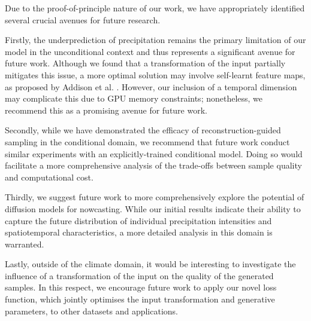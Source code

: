 \documentclass[ oneside,%
                    author={George Herbert},
                    degree={MSci},
                     title={Diffusion Models for Time-Evolving Precipitation Fields},
                  subtitle={}]{dissertation}
\begin{document}
Due to the proof-of-principle nature of our work, we have appropriately identified several crucial avenues for future research.

Firstly, the underprediction of precipitation remains the primary limitation of our model in the unconditional context and thus represents a significant avenue for future work. Although we found that a transformation of the input partially mitigates this issue, a more optimal solution may involve self-learnt feature maps, as proposed by Addison et al. \cite{Addison_Machine_Learning_Emulation}. However, our inclusion of a temporal dimension may complicate this due to GPU memory constraints; nonetheless, we recommend this as a promising avenue for future work.

Secondly, while we have demonstrated the efficacy of reconstruction-guided sampling in the conditional domain, we recommend that future work conduct similar experiments with an explicitly-trained conditional model. Doing so would facilitate a more comprehensive analysis of the trade-offs between sample quality and computational cost.

Thirdly, we suggest future work to more comprehensively explore the potential of diffusion models for nowcasting. While our initial results indicate their ability to capture the future distribution of individual precipitation intensities and spatiotemporal characteristics, a more detailed analysis in this domain is warranted.

Lastly, outside of the climate domain, it would be interesting to investigate the influence of a transformation of the input on the quality of the generated samples. In this respect, we encourage future work to apply our novel loss function, which jointly optimises the input transformation and generative parameters, to other datasets and applications.


%
%
%
\end{document}
